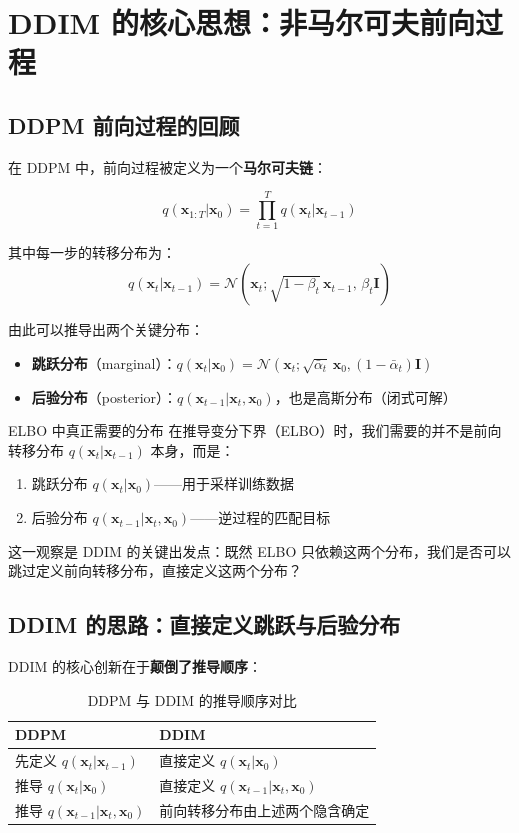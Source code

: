 \section{DDIM 的核心思想：非马尔可夫前向过程}

\subsection{DDPM 前向过程的回顾}

在 DDPM 中，前向过程被定义为一个\textbf{马尔可夫链}：

$$
q(\mathbf{x}_{1:T} | \mathbf{x}_0) = \prod_{t=1}^{T} q(\mathbf{x}_t | \mathbf{x}_{t-1})
$$

其中每一步的转移分布为：
$$
q(\mathbf{x}_t | \mathbf{x}_{t-1}) = \mathcal{N}(\mathbf{x}_t; \sqrt{1-\beta_t}\,\mathbf{x}_{t-1},\, \beta_t \mathbf{I})
$$

由此可以推导出两个关键分布：
\begin{itemize}
    \item \textbf{跳跃分布}（marginal）：$q(\mathbf{x}_t | \mathbf{x}_0) = \mathcal{N}(\mathbf{x}_t; \sqrt{\bar{\alpha}_t}\,\mathbf{x}_0, (1-\bar{\alpha}_t)\mathbf{I})$
    \item \textbf{后验分布}（posterior）：$q(\mathbf{x}_{t-1} | \mathbf{x}_t, \mathbf{x}_0)$，也是高斯分布（闭式可解）
\end{itemize}

\begin{importantbox}{ELBO 中真正需要的分布}
在推导变分下界（ELBO）时，我们需要的并不是前向转移分布 $q(\mathbf{x}_t|\mathbf{x}_{t-1})$ 本身，而是：
\begin{enumerate}
    \item 跳跃分布 $q(\mathbf{x}_t | \mathbf{x}_0)$——用于采样训练数据
    \item 后验分布 $q(\mathbf{x}_{t-1} | \mathbf{x}_t, \mathbf{x}_0)$——逆过程的匹配目标
\end{enumerate}
这一观察是 DDIM 的关键出发点：既然 ELBO 只依赖这两个分布，我们是否可以跳过定义前向转移分布，直接定义这两个分布？
\end{importantbox}

\subsection{DDIM 的思路：直接定义跳跃与后验分布}

DDIM 的核心创新在于\textbf{颠倒了推导顺序}：

\begin{table}[H]
\centering
\caption{DDPM 与 DDIM 的推导顺序对比}
\begin{tabular}{ll}
\toprule
\textbf{DDPM} & \textbf{DDIM} \\
\midrule
先定义 $q(\mathbf{x}_t|\mathbf{x}_{t-1})$ & 直接定义 $q(\mathbf{x}_t|\mathbf{x}_0)$ \\
推导 $q(\mathbf{x}_t|\mathbf{x}_0)$ & 直接定义 $q(\mathbf{x}_{t-1}|\mathbf{x}_t, \mathbf{x}_0)$ \\
推导 $q(\mathbf{x}_{t-1}|\mathbf{x}_t, \mathbf{x}_0)$ & 前向转移分布由上述两个隐含确定 \\
\bottomrule
\end{tabular}
\end{table}

